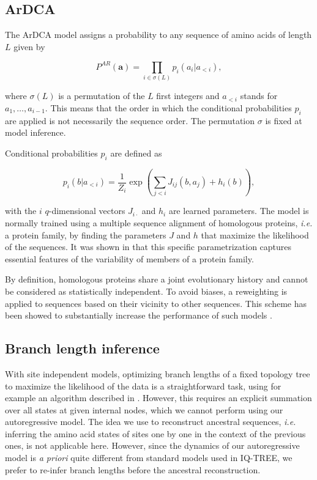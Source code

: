 \subsection{ArDCA}

The ArDCA model assigns a probability to any sequence of amino acids of length $L$ given by 

\begin{equation}
	\label{eq:autoregressive_def_methods}
	P^{AR}(\mathbf{a}) = \prod_{i \in \sigma(L)} p_i(a_i \vert a_{<i}),
\end{equation}

where $\sigma(L)$ is a permutation of the $L$ first integers and $a_{<i}$ stands for $a_1, \ldots, a_{i-1}$. 
This means that the order in which the conditional probabilities $p_i$ are applied is not necessarily the sequence order. 
The permutation $\sigma$ is fixed at model inference. 

Conditional probabilities $p_i$ are defined as

\begin{equation}
	p_i(b \vert a_{<i}) = \frac{1}{Z_i}\exp\left( \sum_{j < i} J_{ij}(b, a_j) + h_i(b) \right),
\end{equation}

with the $i$ $q$-dimensional vectors $J_{i\cdot}$ and $h_i$ are learned parameters. 
The model is normally trained using a multiple sequence alignment of homologous proteins, \emph{i.e.} a protein family, by finding the parameters $J$ and $h$ that maximize the likelihood of the sequences. 
It was shown in \cite{trinquier_efficientgenerativemodeling_2021} that this specific parametrization captures essential features of the variability of members of a protein family.

By definition, homologous proteins share a joint evolutionary history and cannot be considered as statistically independent. 
To avoid biases, a reweighting is applied to sequences based on their vicinity to other sequences. 
This scheme has been showed to substantially increase the performance of such models \cite{cocco_inversestatisticalphysics_2018}. 

\subsection{Branch length inference}

With site independent models, optimizing branch lengths of a fixed topology tree to maximize the likelihood of the data is a straightforward task, using for example an algorithm described in \cite{felsensteinjoseph_inferringphylogenies_2003}.
However, this requires an explicit summation over all states at given internal nodes, which we cannot perform using our autoregressive model. 
The idea we use to reconstruct ancestral sequences, \emph{i.e.} inferring the amino acid states of sites one by one in the context of the previous ones, is not applicable here. 
However, since the dynamics of our autoregressive model is \emph{a priori} quite different from standard models used in IQ-TREE, we prefer to re-infer branch lengths before the ancestral reconstruction.

